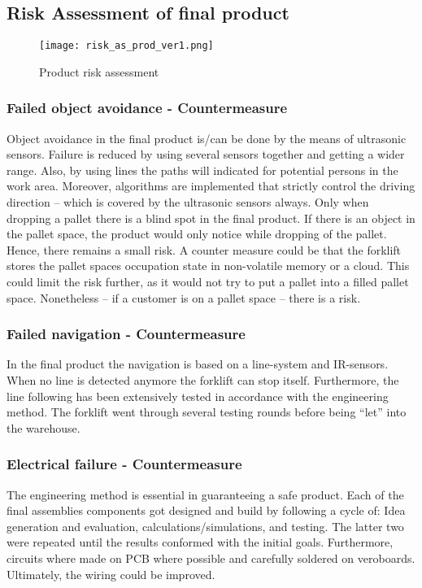 \documentclass[../report.tex]{subfiles}
\begin{document}
\subsection{Risk Assessment of final product}
\begin{figure}[h!]
    \centering
    \texttt{[image: risk\_as\_prod\_ver1.png]}
    \caption{Product risk assessment}
 \end{figure}
\subsubsection{Failed object avoidance - Countermeasure}
Object avoidance in the final product is/can be done by the means of ultrasonic sensors. 
Failure is reduced by using several sensors together and getting a wider range. Also, by 
using lines the paths will indicated for potential persons in the work area. Moreover, 
algorithms are implemented that strictly control the driving direction – 
which is covered by the ultrasonic sensors always. Only when dropping a pallet there is 
a blind spot in the final product. If there is an object in the pallet space, the product 
would only notice while dropping of the pallet. Hence, there remains a small risk. A counter 
measure could be that the forklift stores the pallet spaces occupation state in non-volatile 
memory or a cloud. This could limit the risk further, as it would not try to put a pallet into 
a filled pallet space. Nonetheless – if a customer is on a pallet space – there is a risk.

\subsubsection{Failed navigation - Countermeasure} 
In the final product the navigation is based on a line-system and IR-sensors. 
When no line is detected anymore the forklift can stop itself. Furthermore, 
the line following has been extensively tested in accordance with the engineering 
method. The forklift went through several testing rounds before being “let” into the warehouse.

\subsubsection{Electrical failure - Countermeasure} 
The engineering method is essential in guaranteeing a safe product. Each of the final assemblies 
components got designed and build by following a cycle of: Idea generation and evaluation, 
calculations/simulations, and testing. The latter two were repeated until the results conformed 
with the initial goals. 
Furthermore, circuits where made on PCB where possible and carefully soldered on veroboards. 
Ultimately, the wiring could be improved.
\end{document}
